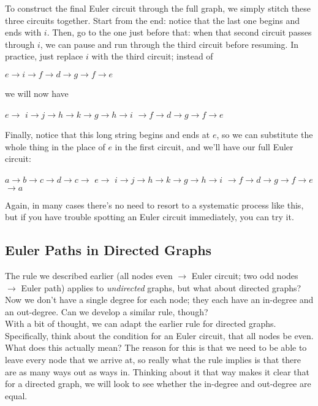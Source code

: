 To construct the final Euler circuit through the full graph, we simply stitch these three circuits together.  Start from the end: notice that the last one begins and ends with $i$.  Then, go to the one just before that: when that second circuit passes through $i$, we can pause and run through the third circuit before resuming.  In practice, just replace $i$ with the third circuit; instead of 
\begin{center}
{\color{green!50!black}$e \to i \to f \to d \to g \to f \to e$}
\end{center}
we will now have
\begin{center}
{\color{green!50!black}$e \to$} {\color{red!80!black}$i \to j \to h \to k \to g \to h \to i$} {\color{green!50!black}$\to f \to d \to g \to f \to e$}
\end{center}

Finally, notice that this long string begins and ends at $e$, so we can substitute the whole thing in the place of $e$ in the first circuit, and we'll have our full Euler circuit:
\begin{center}
{\color{blue!60!black}$a \to b \to c \to d \to c \to$} {\color{green!50!black}$e \to$} {\color{red!80!black}$i \to j \to h \to k \to g \to h \to i$} {\color{green!50!black}$\to f \to d \to g \to f \to e$} {\color{blue!60!black}$\to a$}
\end{center}

Again, in many cases there's no need to resort to a systematic process like this, but if you have trouble spotting an Euler circuit immediately, you can try it.

\subsection{Euler Paths in Directed Graphs}
The rule we described earlier (all nodes even $\to$ Euler circuit; two odd nodes $\to$ Euler path) applies to \emph{undirected} graphs, but what about directed graphs?  Now we don't have a single degree for each node; they each have an in-degree and an out-degree.  Can we develop a similar rule, though?\\

With a bit of thought, we can adapt the earlier rule for directed graphs.  Specifically, think about the condition for an Euler circuit, that all nodes be even.  What does this actually mean?  The reason for this is that we need to be able to leave every node that we arrive at, so really what the rule implies is that there are as many ways out as ways in.  Thinking about it that way makes it clear that for a directed graph, we will look to see whether the in-degree and out-degree are equal.\\

